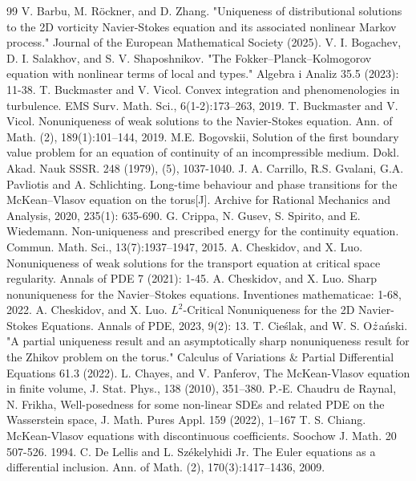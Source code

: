 \documentclass[10pt,a4paper]{amsart}
\numberwithin{equation}{section}
\begin{document}
\begin{thebibliography}{99}
 V. Barbu, M. R\"ockner, and D. Zhang. "Uniqueness of distributional solutions to the 2D vorticity Navier-Stokes equation and its associated nonlinear Markov process." Journal of the European Mathematical Society (2025).
 V. I. Bogachev, D. I. Salakhov, and S. V. Shaposhnikov. "The Fokker–Planck–Kolmogorov equation with nonlinear terms of local and types." Algebra i Analiz 35.5 (2023): 11-38.
 T. Buckmaster and V. Vicol. \newblock Convex integration and phenomenologies in turbulence. \newblock EMS Surv. Math. Sci., 6(1-2):173--263, 2019.
 T. Buckmaster and V. Vicol. Nonuniqueness of weak solutions to the Navier-Stokes equation. Ann. of Math. (2), 189(1):101–144, 2019.
 M.E. Bogovskii, Solution of the first boundary value problem for an equation of continuity of an incompressible medium. Dokl. Akad. Nauk SSSR. 248 (1979), (5), 1037-1040.
 J. A. Carrillo, R.S. Gvalani, G.A. Pavliotis and A. Schlichting. Long-time behaviour and phase transitions for the McKean–Vlasov equation on the torus[J]. Archive for Rational Mechanics and Analysis, 2020, 235(1): 635-690.
 G. Crippa, N. Gusev, S. Spirito, and E. Wiedemann. Non-uniqueness and prescribed energy for the continuity equation. Commun. Math. Sci., 13(7):1937–1947, 2015.
 A. Cheskidov, and X. Luo. Nonuniqueness of weak solutions for the transport equation at critical space regularity. Annals of PDE 7 (2021): 1-45.
 A. Cheskidov, and X. Luo. Sharp nonuniqueness for the Navier–Stokes equations. Inventiones mathematicae: 1-68, 2022.
 A. Cheskidov, and X. Luo. $L^2$-Critical Nonuniqueness for the 2D Navier-Stokes Equations. Annals of PDE, 2023, 9(2): 13.
 T. Cie\'slak, and W. S. O$\rm\dot{z}$a\'nski. "A partial uniqueness result and an asymptotically sharp nonuniqueness result for the Zhikov problem on the torus." Calculus of Variations \& Partial Differential Equations 61.3 (2022).
 L. Chayes, and V. Panferov, The McKean-Vlasov equation in finite volume, J. Stat. Phys., 138 (2010), 351–380.
 P.-E. Chaudru de Raynal, N. Frikha, Well-posedness for some non-linear SDEs and related PDE on the Wasserstein space, J. Math. Pures Appl. 159 (2022), 1–167
 T. S. Chiang. McKean-Vlasov equations with discontinuous coefficients. Soochow J. Math. 20 507-526. 1994.
 C. De Lellis and L. Sz{\'e}kelyhidi Jr. The Euler equations as a differential inclusion. Ann. of Math. (2), 170(3):1417–1436, 2009.

\end{thebibliography}
\end{document}
